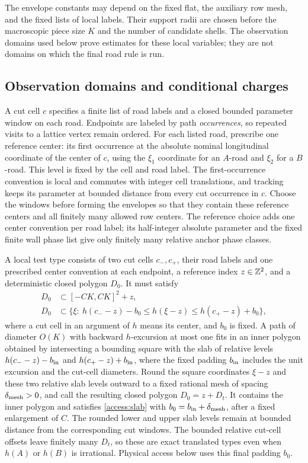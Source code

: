 The envelope constants may depend on the fixed flat, the auxiliary row
mesh, and the fixed lists of local labels.  Their support radii are
chosen before the macroscopic piece size $K$ and the number of candidate
shells.  The observation domains used below prove estimates for these
local variables; they are not domains on which the final road rule is
run.

\subsection{Observation domains and conditional charges}

A cut cell $c$ specifies a finite list of road labels and a closed bounded
parameter window on each road.  Endpoints are labeled by path
\emph{occurrences}, so repeated visits to a lattice vertex remain
ordered. For each listed road, prescribe one reference center: its first
occurrence at the absolute nominal longitudinal coordinate of the center
of $c$, using the $\xi_1$ coordinate for an $A$-road and $\xi_2$ for a
$B$-road. This level is fixed by the cell and road label. The
first-occurrence convention is local and commutes with integer cell
translations, and tracking keeps its parameter at bounded distance from
every cut occurrence in $c$. Choose the windows before forming the
envelopes so that they contain these reference centers and all finitely
many allowed row centers. The reference choice adds one center convention
per road label; its half-integer absolute parameter and the fixed finite
wall phase list give only finitely many relative anchor phase classes.

A local test type consists of two cut cells $c_-,c_+$, their road labels
and one prescribed center convention at each endpoint, a reference index
$z\in\mathbb Z^2$, and a deterministic closed polygon $D_0$. It must
satisfy
\begin{equation}\label{access:slab}
 \begin{split}
 D_0&\subset [-C K,C K]^2+z,\\
 D_0&\subset
 \{\xi:\ h(c_--z)-b_0\le h(\xi-z)\le h(c_+-z)+b_0\},
 \end{split}
\end{equation}
where a cut cell in an argument of $h$ means its center, and $b_0$ is fixed.
A path of diameter $O(K)$ with backward $h$-excursion at most one fits
in an inner polygon obtained by intersecting a bounding square with the
slab of relative levels $h(c_--z)-b_{\rm in}$ and
$h(c_+-z)+b_{\rm in}$, where the fixed padding $b_{\rm in}$ includes
the unit excursion and the cut-cell diameters. Round the square
coordinates $\xi-z$ and these two relative slab levels outward to a
fixed rational mesh of spacing $\delta_{\rm mesh}>0$, and call the
resulting closed polygon $D_0=z+D_t$. It contains the inner polygon and
satisfies \eqref{access:slab} with
$b_0=b_{\rm in}+\delta_{\rm mesh}$, after a fixed enlargement of $C$.
The rounded lower and upper slab levels remain at bounded distance from
the corresponding cut windows. The bounded relative cut-cell offsets
leave finitely many $D_t$, so these are exact translated types even when
$h(A)$ or $h(B)$ is irrational. Physical access below uses this final
padding $b_0$.

